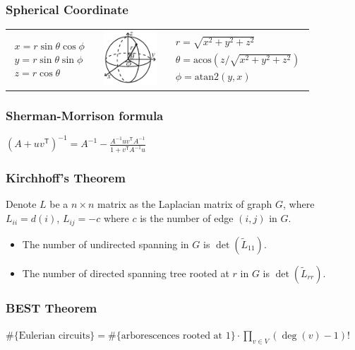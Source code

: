 \vspace{-0.5em}
\subsubsection{Spherical Coordinate}
\begin{tabular}{b{2.5cm}m{2cm}b{2.5cm}}
  {$\begin{aligned}
      x = r\sin\theta\cos\phi \\
      y = r\sin\theta\sin\phi \\
      z = r\cos\theta
  \end{aligned}$}
    &
    \hbox{
      \includegraphics[width=20mm]{../codes/Misc/sphericalCoordinates.pdf}
    }
    &
    {$\begin{aligned}
        r = \sqrt{x^2+y^2+z^2} \\
        \theta = \textrm{acos}(z/\sqrt{x^2+y^2+z^2}) \\
        \phi = \textrm{atan2}(y,x)
    \end{aligned}$}
\end{tabular}

\subsubsection{Sherman-Morrison formula}
$\left(A + uv^\textsf{T}\right)^{-1} = A^{-1} - \frac{A^{-1}uv^\textsf{T}A^{-1}}{1 + v^\textsf{T}A^{-1}u}$

\subsubsection{Kirchhoff's Theorem}
Denote $L$ be a $n \times n$ matrix as the Laplacian matrix of graph $G$, where $L_{ii} = d(i)$, $L_{ij} = -c$ where $c$ is the number of edge $(i, j)$ in $G$.
\begin{itemize}
    \item The number of undirected spanning in $G$ is $\det(\tilde{L}_{11})$.
    \item The number of directed spanning tree rooted at $r$ in $G$ is $\det(\tilde{L}_{rr})$.
\end{itemize}

\subsubsection{BEST Theorem}
$
\text{\#\{Eulerian circuits\}} =
  \text{\#\{arborescences rooted at 1\}} \cdot
   \prod _ {v \in V} (\deg(v) - 1)!
$

